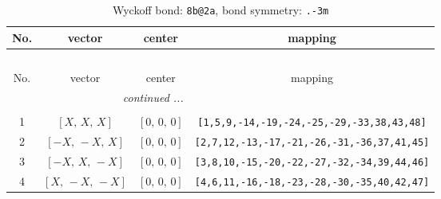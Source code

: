 \documentclass[fleqn,8pt]{jsarticle}
\begin{document}
\begin{longtable}{cccc}
\caption{Wyckoff bond: {\tt 8b@2a}, bond symmetry: {\tt .-3m}}
 \\
 \hline \hline
No. & vector & center & mapping \\ \hline \endfirsthead

\multicolumn{3}{l}{\tablename\ \thetable{}} \\
 \hline \hline
No. & vector & center & mapping \\ \hline \endhead

 \hline \hline
\multicolumn{3}{r}{\footnotesize\it continued ...} \\ \endfoot

 \hline \hline
\multicolumn{3}{r}{} \\ \endlastfoot

1 & $\left[ X,\, X,\, X \right]$ & $\left[ 0,\, 0,\, 0 \right]$ & {\tt [1,5,9,-14,-19,-24,-25,-29,-33,38,43,48]} \\ \hline
2 & $\left[ - X,\, - X,\, X \right]$ & $\left[ 0,\, 0,\, 0 \right]$ & {\tt [2,7,12,-13,-17,-21,-26,-31,-36,37,41,45]} \\ \hline
3 & $\left[ - X,\, X,\, - X \right]$ & $\left[ 0,\, 0,\, 0 \right]$ & {\tt [3,8,10,-15,-20,-22,-27,-32,-34,39,44,46]} \\ \hline
4 & $\left[ X,\, - X,\, - X \right]$ & $\left[ 0,\, 0,\, 0 \right]$ & {\tt [4,6,11,-16,-18,-23,-28,-30,-35,40,42,47]} \\
\end{longtable}
\renewcommand{\arraystretch}{1.2}
\end{document}
